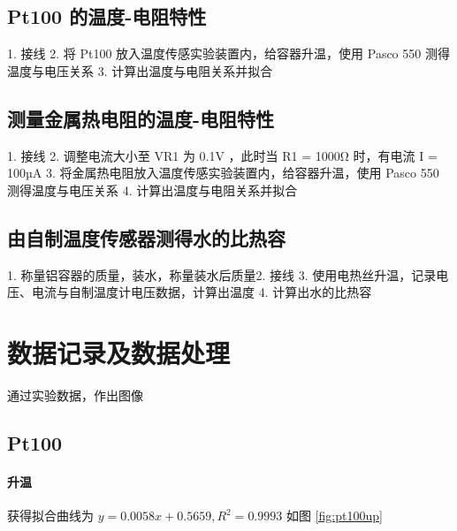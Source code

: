 \documentclass[a4paper]{../phyreport}
\begin{document}
\subsection{Pt100 的温度-电阻特性}
1. 接线
2. 将 Pt100 放入温度传感实验装置内，给容器升温，使用 Pasco 550 测得温度与电压关系
3. 计算出温度与电阻关系并拟合

\subsection{测量金属热电阻的温度-电阻特性}
1. 接线
2. 调整电流大小至 VR1 为 0.1V ，此时当 R1 = 1000Ω 时，有电流 I = 100µA
3. 将金属热电阻放入温度传感实验装置内，给容器升温，使用 Pasco 550 测得温度与电压关系
4. 计算出温度与电阻关系并拟合
\subsection{由自制温度传感器测得水的比热容}
1. 称量铝容器的质量，装水，称量装水后质量2. 接线
3. 使用电热丝升温，记录电压、电流与自制温度计电压数据，计算出温度
4. 计算出水的比热容
\longLine
\section{数据记录及数据处理}
通过实验数据，作出图像
\subsection{Pt100}
\paragraph{升温}
获得拟合曲线为 $y=0.0058x+0.5659,R^2=0.9993$ 如图 \ref{fig:pt100up}
\end{document}
